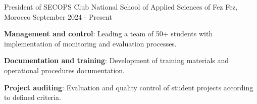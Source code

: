 \begin{cventries}
    \cventry
    {President of SECOPS Club}
    {National School of Applied Sciences of Fez} %
    {Fez, Morocco} %
    {September 2024 - Present} %
    {
        \begin{cvitems} %
            \item {\textbf{Management and control}: Leading a team of 50+ students with implementation of monitoring and evaluation processes.}
            \item {\textbf{Documentation and training}: Development of training materials and operational procedures documentation.}
            \item {\textbf{Project auditing}: Evaluation and quality control of student projects according to defined criteria.}
        \end{cvitems}
    }
\end{cventries}